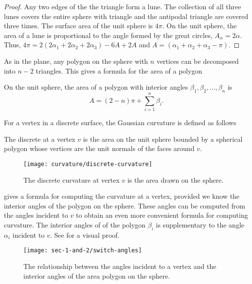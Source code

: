 \begin{proof}
Any two edges of the the triangle form a lune. The collection of 
all three lunes covers the entire sphere with triangle and the antipodal triangle
are covered three times. The surface area of the unit sphere is $4\pi$.
On the unit sphere, the area of a lune is proportional to the angle formed
by the great circles, $A_\alpha=2\alpha$.
Thus, $4\pi=2(2\alpha_1+2\alpha_2+2\alpha_3)-6A+2A$
and $A=(\alpha_1+\alpha_2+\alpha_3-\pi)$.
\end{proof}

As in the plane, any polygon on the sphere with $n$ vertices can be decomposed
into $n-2$ triangles. This gives a formula for the area of a polygon

\begin{corollary}\label{cor:sphere-area}
On the unit sphere, the area of a polygon with interior angles
$\beta_1,\beta_2,\ldots, \beta_n$
is $$A=(2-n)\pi +\sum_{i=1}^n \beta_i.$$

\end{corollary}

For a vertex in a discrete surface, the Gaussian curvature is defined as
follows

\begin{definition}\label{def:discrete-curvature-vertex}

The discrete  at a vertex $v$ is the area on the unit sphere bounded by a spherical polygon whose vertices are the unit normals of the faces around $v$.

\end{definition}


\begin{figure}[htb]
\centering
\texttt{[image: curvature/discrete-curvature]}
\caption{The discrete curvature at vertex $v$ is the area drawn on the sphere.}
\label{fig:discrete-curvature}
\end{figure}


 gives a formula for computing the curvature at a vertex, provided
we know the interior angles of the polygon on the sphere.
These angles can be computed from the angles incident to $v$ to
obtain an even more convenient formula for computing curvature.
The interior angles of of the polygon $\beta_i$ is supplementary to
the angle $\alpha_i$ incident to $v$.
See  for a visual proof.


\begin{figure}[htb]
\centering
\texttt{[image: sec-1-and-2/switch-angles]}
\caption{The relationship between the angles incident to a vertex and
the interior angles of the area polygon on the sphere.}
\label{fig:switcheroo}
\end{figure}


